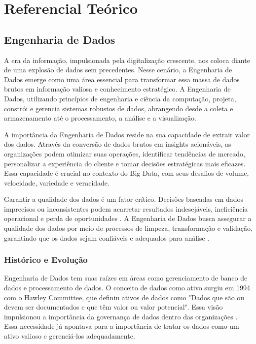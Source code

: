 
\chapter[Referencial Teórico]{Referencial Teórico}

\section{Engenharia de Dados}

A era da informação, impulsionada pela digitalização crescente, nos coloca diante de uma explosão 
de dados sem precedentes. Nesse cenário, a Engenharia de Dados emerge como uma área essencial
para transformar essa massa de dados brutos em informação valiosa e conhecimento estratégico. A 
Engenharia de Dados, utilizando princípios de engenharia e ciência da computação, projeta, constrói 
e gerencia sistemas robustos de dados, abrangendo desde a coleta e armazenamento até o processamento, a análise e a visualização.

A importância da Engenharia de Dados reside na sua capacidade de extrair valor dos dados. Através 
da conversão de dados brutos em insights acionáveis, as organizações podem otimizar suas operações, 
identificar tendências de mercado, personalizar a experiência do cliente e tomar decisões estratégicas 
mais eficazes. Essa capacidade é crucial no contexto do Big Data, com seus desafios de volume, 
velocidade, variedade e veracidade.

Garantir a qualidade dos dados é um fator crítico. Decisões baseadas em dados imprecisos ou 
inconsistentes podem acarretar resultados indesejáveis, ineficiência operacional e perda de 
oportunidades \cite{impact_poor_data_1998}. A Engenharia de Dados busca assegurar a qualidade dos dados por meio de processos 
de limpeza, transformação e validação, garantindo que os dados sejam confiáveis e adequados para análise \cite{haug2011costs}.

\subsection{Histórico e Evolução}
Engenharia de Dados tem suas raízes em áreas como
gerenciamento de banco de dados e processamento de dados. O conceito de dados como ativo surgiu em 1994 com o Hawley 
Committee, que definiu ativos de dados como "Dados que são ou devem ser documentados e que têm 
valor ou valor potencial". Essa visão impulsionou a importância da governança de dados dentro 
das organizações \cite{alhassan2016data}. Essa necessidade já apontava para a importância de tratar os dados como um ativo valioso e gerenciá-los adequadamente.

